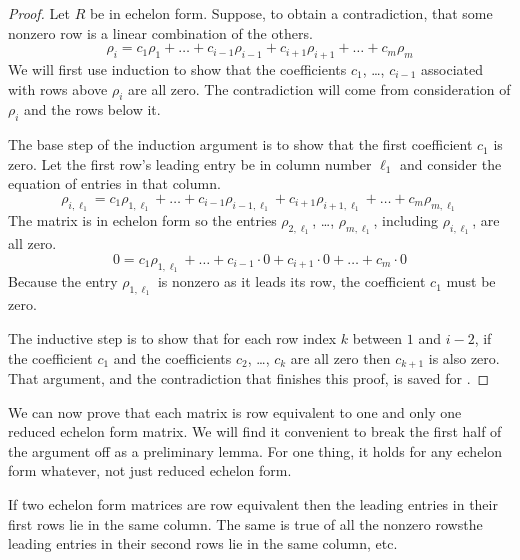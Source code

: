 \begin{proof}
Let $R$ be in echelon form.
Suppose, to obtain a contradiction, that some nonzero row is a linear
combination of the others.
\begin{equation*}
   \rho_i=c_1\rho_1+\ldots+c_{i-1}\rho_{i-1}+
               c_{i+1}\rho_{i+1}+\ldots+c_m\rho_m
\end{equation*}
We will first use induction to show that the coefficients 
$c_1$, \ldots, $c_{i-1}$ associated with rows above $\rho_i$ are all zero.
The contradiction will come from consideration of $\rho_i$ and the rows below
it.

The base step of the induction argument 
is to show that the first coefficient $c_1$ is zero.
Let the first row's leading entry be in column number \( \ell_1 \) 
and consider the equation of entries in that column.
\begin{equation*}
   \rho_{i,\ell_1}=c_1\rho_{1,\ell_1}+\ldots+c_{i-1}\rho_{i-1,\ell_1}
               +c_{i+1}\rho_{i+1,\ell_1}+\ldots+c_m\rho_{m,\ell_1}
\end{equation*}
The matrix is in echelon form so the entries 
$\rho_{2,\ell_1}$, \ldots, $\rho_{m,\ell_1}$, including
$\rho_{i,\ell_1}$, are all zero. 
\begin{equation*}
   0=c_1\rho_{1,\ell_1}+\dots+c_{i-1}\cdot 0
               +c_{i+1}\cdot 0+\dots+c_m\cdot 0
\end{equation*}
Because the entry $\rho_{1,\ell_1}$ is nonzero as it leads its row,
the coefficient $c_1$ must be zero.  

The inductive step is to show that 
for each row index $k$ between $1$ and $i-2$,
if the coefficient $c_1$ and the 
coefficients $c_2$, \ldots, $c_{k}$ are all zero 
then $c_{k+1}$ is also zero.
That argument,
and the contradiction that finishes this proof, is saved for 
.
\end{proof}

We can now prove that each matrix is row equivalent to one and only one
reduced echelon form matrix.
We will find it convenient to break the first half of the argument off as a
preliminary lemma.
For one thing, it holds for any echelon form whatever, not just
reduced echelon form.

\begin{lemma}  \label{le:EquivMatsSameForm}
If two echelon form matrices are row equivalent then the leading entries in
their first rows lie in the same column.
The same is true of all the nonzero rows\Dash the leading entries in their 
second rows lie in the same column, etc.
\end{lemma}

